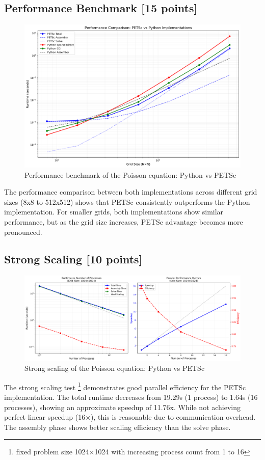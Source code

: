 \documentclass[unicode,11pt,a4paper,oneside,numbers=endperiod,openany]{scrartcl}
\begin{document}
\subsection{Performance Benchmark [15 points]}

\begin{figure}[H]
    \centering
    \includegraphics[width=\textwidth]{../src-5/poisson/test_perf/runtime_comparison.png} %
    \caption{Performance benchmark of the Poisson equation: Python vs PETSc}
\end{figure}
                     
The performance comparison between both implementations across different grid sizes (8x8 to 512x512) shows that 
PETSc consistently outperforms the Python implementation. 
For smaller grids, both implementations show similar performance, but as the grid size increases, 
PETSc advantage becomes more pronounced. 

\subsection{Strong Scaling [10 points]}

\begin{figure}[H]
    \centering
    \includegraphics[width=\textwidth]{../src-5/poisson/test_scale/parallel_scaling.png} %
    \caption{Strong scaling of the Poisson equation: Python vs PETSc}
\end{figure}
The strong scaling test \footnote{fixed problem size 1024×1024 with increasing process count from 1 to 16} demonstrates good parallel efficiency for the PETSc implementation.
 The total runtime decreases from 19.29s (1 process) to 1.64s (16 processes), showing an approximate speedup of 11.76x. While not achieving perfect linear speedup (16×), 
 this is reasonable due to communication overhead. The assembly phase shows better scaling efficiency than the solve phase.
\end{document}

